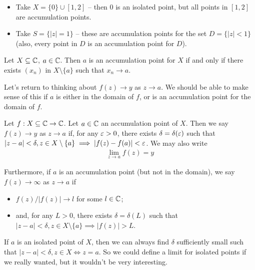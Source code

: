 \documentclass{../template/note}
\begin{document}
    \begin{example}
        \begin{itemize}
            \item Take \(X = \{0\} \cup [1, 2]\) -- then 0 is an isolated point, but all points in \([1, 2]\) are accumulation points.
            \item Take \(S = \{|z| = 1\}\) -- these are accumulation points for the set \(D = \{|z| < 1\}\) (also, every point in \(D\) is an accumulation point for \(D\)).
        \end{itemize}
    \end{example}
    
    \begin{lemma}
        Let \(X \subseteq \mathbb C\), \(a \in \mathbb C\). Then \(a\) is an accumulation point for \(X\) if and only if there exists \((x_n)\) in \(X \setminus \{a\}\) such that \(x_n \to a\).
    \end{lemma}
    
    Let's return to thinking about \(f(z) \to y\) as \(z \to a\). We should be able to make sense of this if \(a\) is either in the domain of \(f\), or is an accumulation point for the domain of \(f\).
    
    \begin{definition}
        Let \(f: X \subseteq \mathbb C \to \mathbb C\). Let \(a \in \mathbb C\) an accumulation point of \(X\). Then we say \(f(z) \to y\) as \(z \to a\) if, for any \(\varepsilon > 0\), there exists \(\delta = \delta(\varepsilon)\) such that \(|z-a| < \delta, z \in X \setminus \{a\} \implies |f(z)-f(a)| < \varepsilon\). We may also write
        \begin{align*}
            \lim_{z \to a}f(z) = y
        \end{align*}

        Furthermore, if \(a\) is an accumulation point (but not in the domain), we say \(f(z) \to \infty\) as \(z \to a\) if
        \begin{itemize}
            \item \(f(z)/|f(z)| \to l\) for some \(l \in \mathbb C\);
            \item and, for any \(L > 0\), there exists \(\delta = \delta(L)\) such that \(|z-a| < \delta, z \in X \setminus \{a\} \implies |f(z)| > L\).
        \end{itemize}
    \end{definition}
    
    \begin{remark}
        If \(a\) is an isolated point of \(X\), then we can always find \(\delta\) sufficiently small such that \(|z-a| < \delta, z \in X \iff z = a\). So we could define a limit for isolated points if we really wanted, but it wouldn't be very interesting.
    \end{remark}
    
\end{document}
